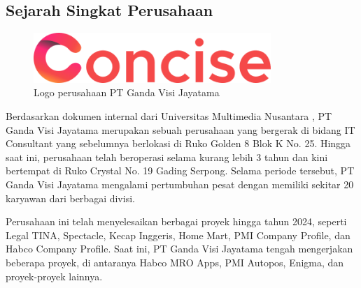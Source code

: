 \chapter{\babDua}

\section{Sejarah Singkat Perusahaan}

\begin{figure}[H]
    \centering
    \includegraphics[width=0.8\textwidth]{assets/pics/conciseLogo.png}
    \caption{Logo perusahaan PT Ganda Visi Jayatama}
    \label{concise-logo}
\end{figure}

Berdasarkan dokumen internal dari Universitas Multimedia Nusantara \cite{umn2023}, 
PT Ganda Visi Jayatama merupakan sebuah perusahaan yang bergerak di bidang IT Consultant 
yang sebelumnya berlokasi di Ruko Golden 8 Blok K No. 25. Hingga saat ini, perusahaan 
telah beroperasi selama kurang lebih 3 tahun dan kini bertempat di Ruko Crystal No. 19 
Gading Serpong. Selama periode tersebut, PT Ganda Visi Jayatama mengalami pertumbuhan 
pesat dengan memiliki sekitar 20 karyawan dari berbagai divisi. 

Perusahaan ini telah menyelesaikan berbagai proyek hingga tahun 2024, seperti Legal 
TINA, Spectacle, Kecap Inggeris, Home Mart, PMI Company Profile, dan Habco Company 
Profile. Saat ini, PT Ganda Visi Jayatama tengah mengerjakan beberapa proyek, di 
antaranya Habco MRO Apps, PMI Autopos, Enigma, dan proyek-proyek lainnya.



